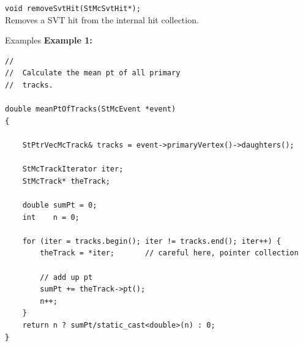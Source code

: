 \begin{Entry}
    \verb+void removeSvtHit(StMcSvtHit*);+\\
    Removes a SVT hit from the internal hit collection.

\item[Examples]
{\bf Example 1:}
{\footnotesize
\begin{verbatim}
//
//  Calculate the mean pt of all primary
//  tracks.

double meanPtOfTracks(StMcEvent *event)
{
    
    StPtrVecMcTrack& tracks = event->primaryVertex()->daughters();

    StMcTrackIterator iter;
    StMcTrack* theTrack;

    double sumPt = 0;
    int    n = 0;

    for (iter = tracks.begin(); iter != tracks.end(); iter++) {
        theTrack = *iter;       // careful here, pointer collection

        // add up pt
        sumPt += theTrack->pt();
        n++;
    }
    return n ? sumPt/static_cast<double>(n) : 0;
}
\end{verbatim}
}%

\end{Entry}
\clearpage
%
%
